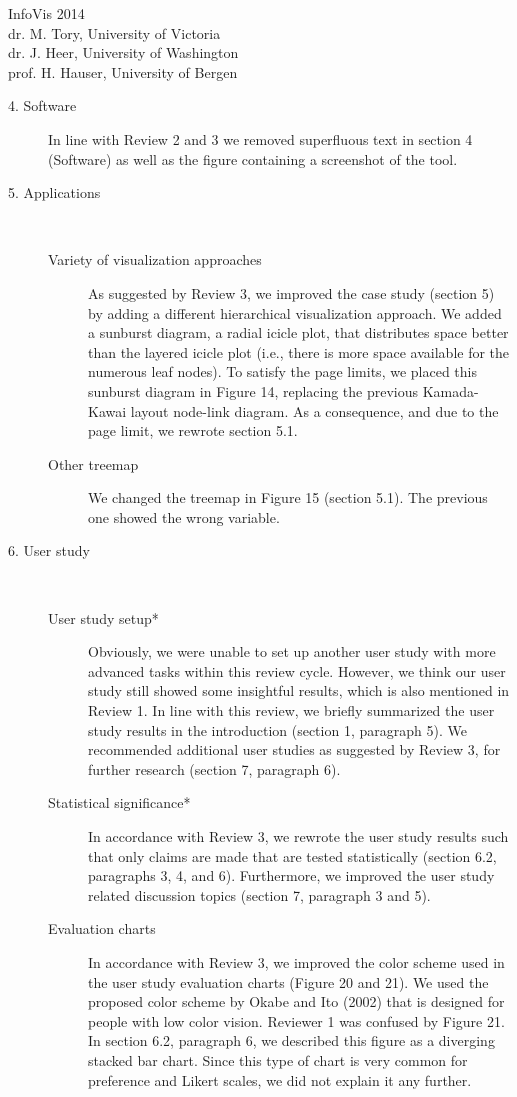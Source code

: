 \documentclass{letter}
\begin{document}
\begin{letter}{InfoVis 2014 \\ dr. M. Tory, University of Victoria \\ dr. J. Heer, University of Washington \\ prof. H. Hauser, University of Bergen}
\begin{description}
\begin{description}
\end{description}
\item[4. Software] In line with Review 2 and 3 we removed superfluous text in section 4 (Software) as well as the figure containing a screenshot of the tool.
\item[5. Applications] \mbox{ }
\begin{description}
\item[Variety of visualization approaches] As suggested by Review 3, we improved the case study (section 5) by adding a different hierarchical visualization approach. We added a sunburst diagram, a radial icicle plot, that distributes space better than the layered icicle plot (i.e., there is more space available for the numerous leaf nodes). To satisfy the page limits, we placed this sunburst diagram in Figure 14, replacing the previous Kamada-Kawai layout node-link diagram. As a consequence, and due to the page limit, we rewrote section 5.1.
\item[Other treemap] We changed the treemap in Figure 15 (section 5.1). The previous one showed the wrong variable.
\end{description}
\item[6. User study]   \mbox{ }
\begin{description}
\item[User study setup*]  Obviously, we were unable to set up another user study with more advanced tasks within this review cycle. However, we think our user study still showed some insightful results, which is also mentioned in Review 1.  In line with this review, we briefly summarized the user study results in the introduction (section 1, paragraph 5). We recommended additional user studies as suggested by Review 3, for further research (section 7, paragraph 6).
\item[Statistical significance*] In accordance with Review 3, we rewrote the user study results such that only claims are made that are tested statistically (section 6.2, paragraphs 3, 4, and 6). Furthermore, we improved the user study related discussion topics (section 7, paragraph 3 and 5).
\item[Evaluation charts] In accordance with Review 3, we improved the color scheme used in the user study evaluation charts (Figure 20 and 21). We used the proposed color scheme by Okabe and Ito (2002) that is designed for people with low color vision. Reviewer 1 was confused by Figure 21. In section 6.2, paragraph 6, we described this figure as a diverging stacked bar chart. Since this type of chart is very common for preference and Likert scales, we did not explain it any further.

\end{description}
\end{description}
\end{letter}
\end{document}
